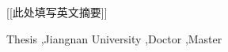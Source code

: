 \jnabstract[en]   %

[[此处填写英文摘要]]



\begin{jnkeywords}[en]
Thesis \sep Jiangnan University \sep Doctor \sep Master
\end{jnkeywords}

